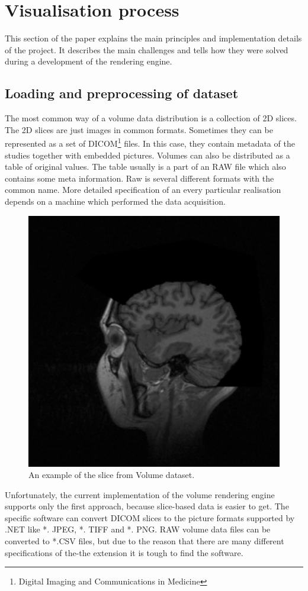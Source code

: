 \documentclass[twoside, english, 11pt]{report}
\begin{document}
\section{Visualisation process}

This section of the paper explains the main principles and implementation details of the project. It describes the main challenges and tells how they were solved during a development of the rendering engine.

\subsection{Loading and preprocessing of dataset}
The most common way of a volume data distribution is a collection of 2D slices. The 2D slices are just images in common formats. Sometimes they can be represented as a set of DICOM\footnote{Digital Imaging and Communications in Medicine} files. In this case, they contain metadata of the studies together with embedded pictures. Volumes can also be distributed as a table of original values. The table usually is a part of an RAW file which also contains some meta information. Raw is several different formats with the common name. More detailed specification of an every particular realisation depends on a machine which performed the data acquisition.\\
\begin{figure}[!h]
\centerline{\includegraphics[scale = 0.35]{img/slice}}
\caption{An example of the slice from Volume dataset.\label{fig:slice}}
\end{figure}
Unfortunately, the current implementation of the volume rendering engine supports only the first approach, because slice-based data is easier to get. The specific software can convert DICOM slices to the picture formats supported by .NET like *. JPEG, *. TIFF and *. PNG. RAW volume data files can be converted to *.CSV files, but due to the reason that there are many different specifications of the-the extension it is tough to find the software.\\
\end{document}
